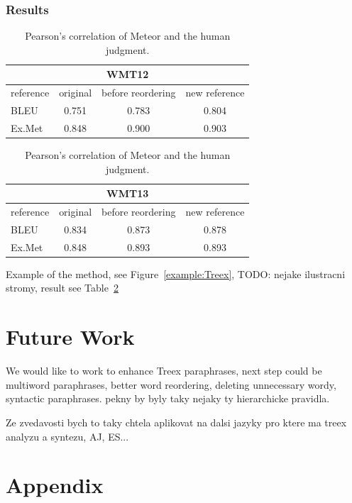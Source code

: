 \documentclass[11pt]{article}
\def\Tref#1{Table~\ref{#1}}
\def\Fref#1{Figure~\ref{#1}}
\begin{document}
\subsubsection{Results}
\begin{table}[tb]
\begin{center}
\begin{tabular}{l|ccc}
\multicolumn{4}{c}{\textbf{WMT12}}\\
\hline
reference & original & before reordering & new reference \\
\hline
BLEU & 0.751 & 0.783  & 0.804 \\
Ex.Met & 0.848 & 0.900 & 0.903 \\
\end{tabular} 

\quad

\begin{tabular}{l|ccc}
\multicolumn{4}{c}{\textbf{WMT13}}\\
\hline
reference & original & before reordering & new reference \\
\hline
BLEU & 0.834 &  0.873 & 0.878 \\
Ex.Met & 0.848 & 0.893 &  0.893\\
\end{tabular}

\caption{Pearson's correlation of Meteor and the human judgment.}
\label{treex_results:12:13}
\end{center}
\end{table}

Example of the method, see \Fref{example:Treex}, TODO: nejake ilustracni stromy, result see \Tref{treex_results:12:13}

\section{Future Work}
We would like to work to enhance Treex paraphrases, next step could be multiword 
paraphrases, better word reordering, deleting unnecessary wordy, syntactic paraphrases.
 pekny by byly
taky nejaky ty hierarchicke pravidla. 

Ze zvedavosti bych to taky chtela aplikovat na dalsi jazyky pro ktere ma treex
analyzu a syntezu, AJ, ES...




\newpage
\newpage 
\section*{Appendix}
\end{document}
